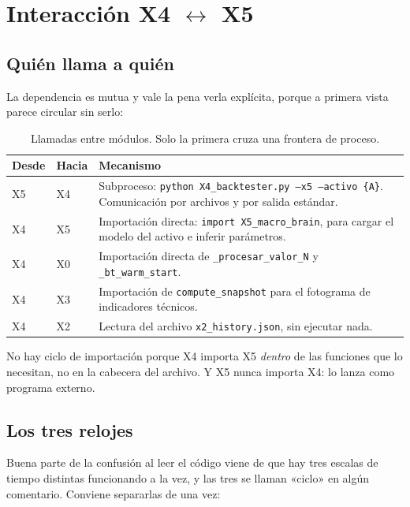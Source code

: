 \documentclass[11pt,a4paper]{article}
\newcommand{\code}[1]{\texttt{\small #1}}
\newcommand{\bigsep}{\par\vspace{3pt}}
\begin{document}
\section{Interacción X4 $\leftrightarrow$ X5}
\label{sec:interaccion}

\subsection{Quién llama a quién}

La dependencia es mutua y vale la pena verla explícita, porque a primera vista parece
circular sin serlo:

\begin{table}[h]
\centering
\small
\begin{tabularx}{\linewidth}{@{}l l X@{}}
\toprule
\textbf{Desde} & \textbf{Hacia} & \textbf{Mecanismo} \\
\midrule
X5 & X4 & Subproceso: \code{python X4_backtester.py --x5 --activo \{A\}}. Comunicación por archivos y por salida estándar. \\
X4 & X5 & Importación directa: \code{import X5_macro_brain}, para cargar el modelo del activo e inferir parámetros. \\
X4 & X0 & Importación directa de \code{_procesar_valor_N} y \code{_bt_warm_start}. \\
X4 & X3 & Importación de \code{compute_snapshot} para el fotograma de indicadores técnicos. \\
X4 & X2 & Lectura del archivo \code{x2_history.json}, sin ejecutar nada. \\
\bottomrule
\end{tabularx}
\caption{Llamadas entre módulos. Solo la primera cruza una frontera de proceso.}
\end{table}

\bigsep
No hay ciclo de importación porque X4 importa X5 \textit{dentro} de las funciones que lo
necesitan, no en la cabecera del archivo. Y X5 nunca importa X4: lo lanza como programa
externo.

\subsection{Los tres relojes}

Buena parte de la confusión al leer el código viene de que hay tres escalas de tiempo
distintas funcionando a la vez, y las tres se llaman «ciclo» en algún comentario. Conviene
separarlas de una vez:
\end{document}
